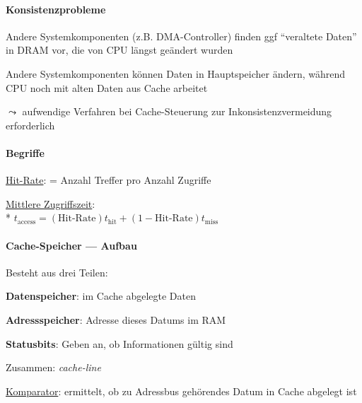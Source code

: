 \paragraph{Konsistenzprobleme}
\begin{items}
	\item Andere Systemkomponenten (z.B. DMA-Controller) finden ggf "`veraltete Daten"' in DRAM vor, die von CPU längst geändert wurden
	\item Andere Systemkomponenten können Daten in Hauptspeicher ändern, während CPU noch mit alten Daten aus Cache arbeitet
	\item \( \leadsto \) aufwendige Verfahren bei Cache-Steuerung zur Inkonsistenzvermeidung erforderlich
\end{items}

\paragraph{Begriffe}
\begin{items}
	\item \underline{Hit-Rate}: = Anzahl Treffer pro Anzahl Zugriffe
	\item \underline{Mittlere Zugriffszeit}: \\*
		\( t_{\text{access}} = (\text{Hit-Rate})t_\text{hit}+(1-\text{Hit-Rate})t_\text{miss} \)
\end{items}

\paragraph{Cache-Speicher --- Aufbau}
\begin{items}
	\item Besteht aus drei Teilen:
	\begin{enumeration}
		\item \textbf{Datenspeicher}: im Cache abgelegte Daten
		\item \textbf{Adressspeicher}: Adresse dieses Datums im RAM
		\item \textbf{Statusbits}: Geben an, ob Informationen gültig sind
	\end{enumeration}
	\item Zusammen: \emph{cache-line}
	\item \underline{Komparator}: ermittelt, ob zu Adressbus gehörendes Datum in Cache abgelegt ist
\end{items}

